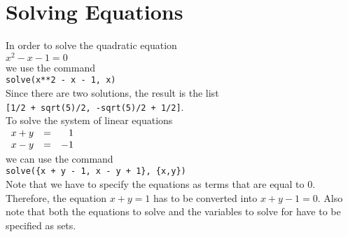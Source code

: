 \documentclass{report}
\begin{document}
\section{Solving Equations}
In order to solve the quadratic equation
\\[0.2cm]
\hspace*{1.3cm}
$x^2 - x - 1 = 0$
\\[0.2cm]
we use the command
\\[0.2cm]
\hspace*{1.3cm}
\texttt{solve(x**2 - x - 1, x)}
\\[0.2cm]
Since there are two solutions, the result is the list
\\[0.2cm]
\hspace*{1.3cm}
\texttt{[1/2 + sqrt(5)/2, -sqrt(5)/2 + 1/2]}.
\\[0.2cm]
To solve the system of linear equations
\\[0.2cm]
\hspace*{1.3cm}
$
\begin{array}[t]{lcr}
  x + y & = &  1 \\
  x - y & = & -1
\end{array}
$
\\[0.2cm]
we can use the command
\\[0.2cm]
\hspace*{1.3cm}
\texttt{solve(\{x + y - 1, x - y + 1\}, \{x,y\})}
\\[0.2cm]
Note that we have to specify the equations as terms that are equal to $0$.  Therefore, the equation
$x + y = 1$ has to be converted into $x + y - 1 = 0$.  Also note that both the equations to solve
and the variables to solve for have to be 
specified as sets.
\end{document}
